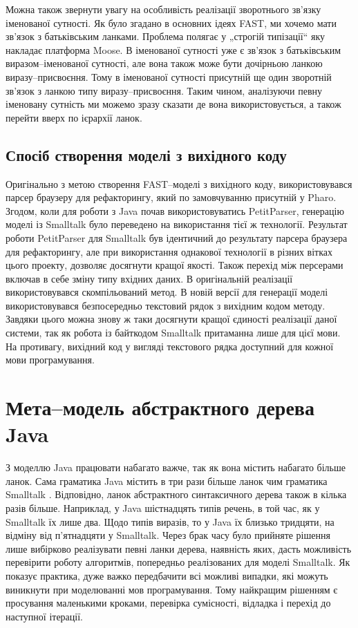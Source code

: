 \documentclass[12pt,a4paper]{article}
\begin{document}
Можна також звернути увагу на особливість реалізації зворотнього зв'язку іменованої сутності. Як було згадано в основних ідеях FAST, ми хочемо мати зв'язок з батьківським ланками. Проблема полягає у „строгій типізації“ яку накладає платформа Moose. В іменованої сутності уже є зв'язок з батьківським виразом--іменованої сутності, але вона також може бути дочірньою ланкою виразу--присвоєння. Тому в іменованої сутності присутній ще один зворотній зв'язок з ланкою типу виразу--присвоєння. Таким чином, аналізуючи певну іменовану сутність ми можемо зразу сказати де вона використовується, а також перейти вверх по ієрархії ланок. 

\subsection{Спосіб створення моделі з вихідного коду}
Оригінально з метою створення FAST--моделі з вихідного коду, використовувався парсер браузеру для рефакторингу, який по замовчуванню присутній у Pharo. Згодом, коли для роботи з Java почав використовуватись PetitParser, генерацію моделі із Smalltalk було переведено на використання тієї ж технології. Результат роботи PetitParser для Smalltalk був ідентичний до результату парсера браузера для рефакторингу, але при використання однакової технології в різних вітках цього проекту, дозволяє досягнути кращої якості. Також перехід між персерами включав в себе зміну типу вхідних даних. В оригінальній реалізації використовувався скомпільований метод. В новій версії для генерації моделі використовувався безпосередньо текстовий рядок з вихідним кодом методу. Завдяки цього можна знову ж таки досягнути кращої єдиності реалізації даної системи, так як робота із байткодом Smalltalk притаманна лише для цієї мови. На противагу, вихідний код у вигляді текстового рядка доступний для кожної мови програмування.

\clearpage

\section{Мета--модель абстрактного дерева Java}

З моделлю Java працювати набагато важче, так як вона містить набагато більше ланок. Сама граматика Java містить в три рази більше ланок чим граматика Smalltalk \cite{meet-grammars}. Відповідно, ланок абстрактного синтаксичного дерева також в кілька разів більше. Наприклад, у Java шістнадцять типів речень, в той час, як у Smalltalk їх лише два. Щодо типів виразів, то у Java їх близько тридцяти, на відміну від п'ятнадцяти у Smalltalk. Через брак часу було прийняте рішення лише вибірково реалізувати певні ланки дерева, наявність яких, дасть можливість перевірити роботу алгоритмів, попередньо реалізованих для моделі Smalltalk. Як показує практика, дуже важко передбачити всі можливі випадки, які можуть виникнути при моделюванні мов програмування. Тому найкращим рішенням є просування маленькими кроками, перевірка сумісності, відладка і перехід до наступної ітерації.
\end{document}
